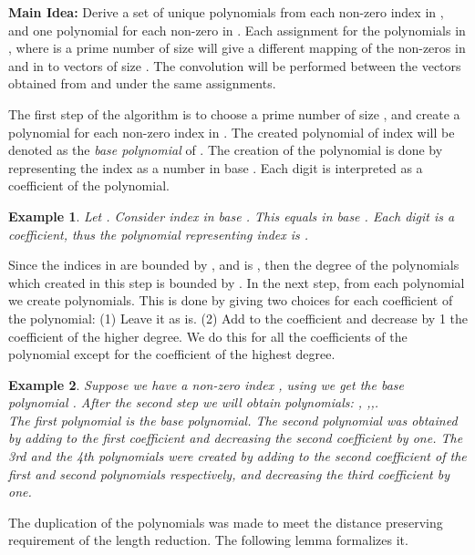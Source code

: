 \documentclass[11pt,amssymb]{article}
\newtheorem{example}{Example}
\begin{document}
{\bf Main Idea:} Derive a set of unique polynomials
from each non-zero index in , and one polynomial for each non-zero
in . Each assignment for the polynomials in , where  is a
prime number of size  will give a different mapping of
the non-zeros in  and in  to vectors of size . The
convolution will be performed between the vectors obtained from
 and  under the same assignments.

The first step of the algorithm is to choose a prime number of size
, and create a polynomial for each non-zero index in
. The created polynomial of index  will be denoted as the {\em
base polynomial} of . The creation of the polynomial is done by
representing the index as a number in base . Each
digit is interpreted as a coefficient of the polynomial.

\begin{example}
Let . Consider index  in base . This equals  in
base . Each digit is a coefficient, thus the
polynomial representing index  is .
\end{example}

Since the indices in  are bounded by , and  is , then the degree of the polynomials which created in this step
is bounded by . In the next step, from each polynomial we create
 polynomials. This is done by giving two choices for each
coefficient of the polynomial:
(1) Leave it as is. (2) Add  to the coefficient and
decrease by 1 the coefficient of the higher degree. We do this for all
the coefficients of the polynomial except for the coefficient of the
highest degree.

\begin{example}
Suppose we have a non-zero index , using  we get the base
polynomial . After the second step we will obtain 
polynomials: , ,,.\\
The first polynomial is the base polynomial. The second polynomial was
obtained by adding  to the first coefficient and decreasing the
second coefficient by one. The 3rd and the 4th polynomials were created
by adding  to the second coefficient of the first and second
polynomials respectively, and decreasing the third coefficient by one.
\end{example}

The duplication of the polynomials was made to meet the distance
preserving requirement of the length reduction. The following lemma
formalizes it.
\end{document}
